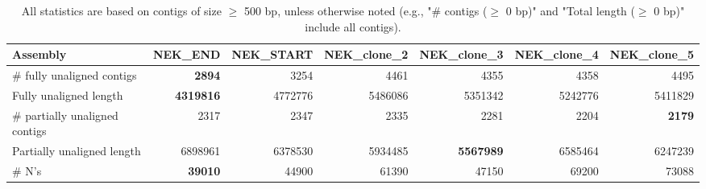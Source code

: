 \documentclass[12pt,a4paper]{article}
\begin{document}
\begin{table}[ht]
\begin{center}
\caption{All statistics are based on contigs of size $\geq$ 500 bp, unless otherwise noted (e.g., "\# contigs ($\geq$ 0 bp)" and "Total length ($\geq$ 0 bp)" include all contigs).}
\begin{tabular}{|l*{6}{|r}|}
\hline
Assembly & NEK\_END & NEK\_START & NEK\_clone\_2 & NEK\_clone\_3 & NEK\_clone\_4 & NEK\_clone\_5 \\ \hline
\# fully unaligned contigs & {\bf 2894} & 3254 & 4461 & 4355 & 4358 & 4495 \\ \hline
Fully unaligned length & {\bf 4319816} & 4772776 & 5486086 & 5351342 & 5242776 & 5411829 \\ \hline
\# partially unaligned contigs & 2317 & 2347 & 2335 & 2281 & 2204 & {\bf 2179} \\ \hline
Partially unaligned length & 6898961 & 6378530 & 5934485 & {\bf 5567989} & 6585464 & 6247239 \\ \hline
\# N's & {\bf 39010} & 44900 & 61390 & 47150 & 69200 & 73088 \\ \hline
\end{tabular}
\end{center}
\end{table}
\end{document}
